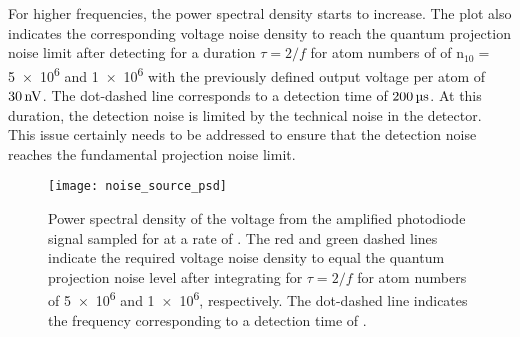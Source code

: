 For higher frequencies, the power spectral density starts to
increase. The plot also indicates the corresponding voltage noise
density to reach the
quantum projection noise limit after detecting for a duration $\tau =
2/f$ for atom numbers of 
of n\(_{10} =\) \num{5e6} and \num{1e6} with the previously
defined output voltage per atom of $\sivalue{30}{\nano\volt}$. The
dot-dashed line corresponds to a detection time of
$\sivalue{200}{\micro\s}$. At this duration, the detection noise is
limited by the technical noise in the detector. This issue certainly
needs to be addressed to ensure that the detection noise reaches the
fundamental projection noise limit. 
\begin{figure}[htpb!]
  \centering
  \texttt{[image: noise\_source\_psd]}
  \caption[Photodiode power spectral density]{Power spectral density
    of the voltage from the amplified photodiode signal
  sampled for  at a rate of
. The red and green dashed lines indicate
the required voltage noise density to equal the quantum projection
noise level
after integrating for \(\tau = 2/f\)\sivalue{}{\s} for atom numbers of
\num{5e6} and \num{1e6}, respectively. The dot-dashed line indicates
the frequency corresponding to a detection time of
.}
  \label{fig:noise_source_psd}
\end{figure}

